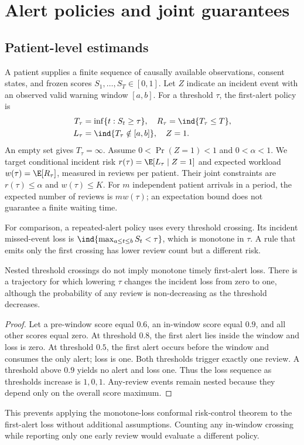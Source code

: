 \section{Alert policies and joint guarantees}\label{sec:theory}
\subsection{Patient-level estimands}
A patient supplies a finite sequence of causally available observations, consent states, and frozen scores $S_1,\ldots,S_T\in[0,1]$. Let $Z$ indicate an incident event with an observed valid warning window $[a,b]$. For a threshold $\tau$, the first-alert policy is
\begin{equation}
 \begin{aligned}
 T_\tau&=\inf\{t:S_t\ge\tau\},\quad R_\tau=\ind\{T_\tau\le T\},\\
 L_\tau&=\ind\{T_\tau\notin[a,b]\},\quad Z=1.
 \end{aligned}
 \label{eq:first}
\end{equation}
An empty set gives $T_\tau=\infty$. Assume $0<\Pr(Z=1)<1$ and $0<\alpha<1$. We target conditional incident risk $r(\tau)=\E[L_\tau\mid Z=1]$ and expected workload $w(\tau)=\E[R_\tau]$, measured in reviews per patient. Their joint constraints are $r(\tau)\le\alpha$ and $w(\tau)\le K$. For $m$ independent patient arrivals in a period, the expected number of reviews is $mw(\tau)$; an expectation bound does not guarantee a finite waiting time.

For comparison, a repeated-alert policy uses every threshold crossing. Its incident missed-event loss is $\ind\{\max_{a\le t\le b}S_t<\tau\}$, which is monotone in $\tau$. A rule that emits only the first crossing has lower review count but a different risk.

\begin{proposition}\label{prop:nonmono}
Nested threshold crossings do not imply monotone timely first-alert loss. There is a trajectory for which lowering $\tau$ changes the incident loss from zero to one, although the probability of any review is non-decreasing as the threshold decreases.
\end{proposition}
\begin{proof}
Let a pre-window score equal $0.6$, an in-window score equal $0.9$, and all other scores equal zero. At threshold $0.8$, the first alert lies inside the window and loss is zero. At threshold $0.5$, the first alert occurs before the window and consumes the only alert; loss is one. Both thresholds trigger exactly one review. A threshold above $0.9$ yields no alert and loss one. Thus the loss sequence as thresholds increase is $1,0,1$. Any-review events remain nested because they depend only on the overall score maximum.
\end{proof}
This prevents applying the monotone-loss conformal risk-control theorem \citep{crc} to the first-alert loss without additional assumptions. Counting any in-window crossing while reporting only one early review would evaluate a different policy.

